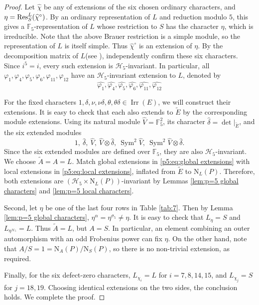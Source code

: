 \documentclass[11pt,a4paper]{article}
\numberwithin{equation}{section}
\theoremstyle{definition}
\theoremstyle{remark}
\newcommand{\Irr}{\operatorname{Irr}}
\newcommand{\Sym}{\operatorname{Sym}}
\newcommand{\HH}{\mathcal H}
\newcommand{\FF}{\mathbb F}
\newcommand{\NN}{\mathrm N}
\newcommand{\et}{\widetilde E}
\newcommand{\AT}{\widetilde A}
\begin{document}
\begin{proof}
Let \(\widehat\chi\) be any of extensions of the six chosen ordinary characters, and \(\eta={\rm Res}_S^L(\widehat\chi^\circ)\). 
By an ordinary representation of \(L\) and reduction modulo \(5\), this gives a $\FF_5$-representation of \(L\) whose restriction to \(S\) has the character \(\eta\), which is irreducible. Note that the above  Brauer restriction
is a simple module, so the representation of \(L\) is itself simple. Thus \(\widehat\chi^\circ\) is an extension of \(\eta\).
By the decomposition matrix of \(L\)(see \cite[Block~1, pp.1--2]{T}),  independently confirm these six characters.
Since \(i^5=i\), every such extension is \(\HH_5\)-invariant. In particular, all $\varphi_1,\varphi_4,\varphi_5,\varphi_6,\varphi_{11},\varphi_{12}$ have an \(\HH_5\)-invariant extension to \(L\), denoted by 
\begin{equation}\label{p5:eq:global extensions}
\widehat{\varphi_1}, \widehat{\varphi_4}, \widehat{\varphi_5},
\widehat{\varphi_6}, \widehat{\varphi_{11}}, \widehat{\varphi_{12}}    
\end{equation}

For the fixed characters $1,\delta,\nu,\nu\delta,\theta,\theta\delta\in\Irr(E)$, we will construct their extensions. It is easy to check that each also extends to \(\et\) by the corresponding module extensions. Using its natural module \(\widehat V=\FF_5^2\), its character \(\widehat\delta=\det|_{\widetilde E}\), and the six extended modules 
\begin{equation}\label{p5:eq:local extensions}
 1,\ \widehat\delta,\ \widehat V,\ \widehat V\otimes\widehat\delta,\
 \Sym^2\widehat V,\ \Sym^2\widehat V\otimes\widehat\delta.
\end{equation}
Since the six extended modules are defined over \(\FF_5\), they are also \(\HH_5\)-invariant. We choose \(\AT=A=L\). Match global extensions in \eqref{p5:eq:global extensions} with  local extensions in \eqref{p5:eq:local extensions}, inflated from \(\et\) to \(\NN_L(P)\). Therefore, both extensions are \((\HH_5\times \NN_L(P))\)-invariant by Lemmas \ref{lem:p=5 global characters} and \ref{lem:p=5 local characters}.

Second, let \(\eta\) be one of the last four rows in Table \ref{tab:7}. Then by Lemma \ref{lem:p=5 global characters}, $\eta^\alpha=\eta^{\sigma_5}\ne\eta$. It is easy to check that $L_\eta=S$ and $L_{\eta^{\HH_5}}=L$. Thus \(\AT=L\), but \(A=S\). In particular, an element combining an outer automorphism with an odd Frobenius power can fix $\eta$.
On the other hand, note that $A/S=1=\NN_A(P)/\NN_S(P)$, so
there is no non-trivial extension, as required.

Finally, for the six defect-zero characters, $L_{\chi_i}=L$ for $i=7,8,14,15$, and $L_{\chi_j}=S$ for $j=18,19$. Choosing identical extensions on the two sides,
the conclusion holds. We complete the proof.
\end{proof}
\end{document}
